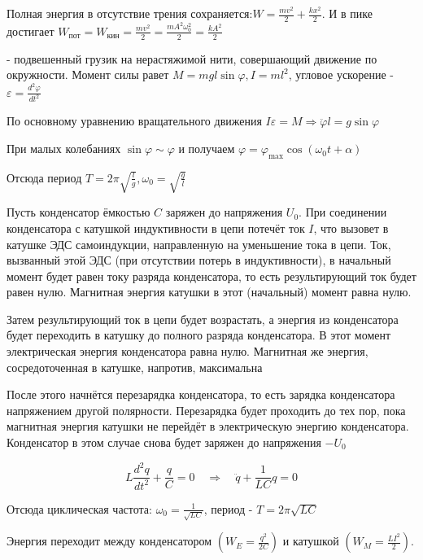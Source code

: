 \documentclass[12pt]{article}
\begin{document}
Полная энергия в отсутствие трения сохраняется:$W = \frac{mv^2}{2} + \frac{kx^2}{2}$.
И в пике достигает $W_{\text{пот}} = W_{\text{кин}} = \frac{mv^2}{2} = \frac{mA^2\omega_0^2}{2} = \frac{kA^2}{2}$
    
 - подвешенный грузик на нерастяжимой нити, совершающий движение по окружности.
Момент силы равет $M = m g l \sin \varphi, I = m l^2$, угловое ускорение - $\varepsilon = \frac{d^2 \varphi}{d t^2}$

По основному уравнению вращательного движения $I \varepsilon = M \Longrightarrow \ddot \varphi l = g \sin \varphi$

При малых колебаниях $\sin \varphi \sim \varphi$ и получаем $\varphi = \varphi_{\max} \cos (\omega_0 t + \alpha)$

Отсюда период $T = 2\pi\sqrt{\frac{l}{g}}, \omega_0 = \sqrt{\frac{g}{l}}$

Пусть конденсатор ёмкостью $C$ заряжен до напряжения $U_0$. 
При соединении конденсатора с катушкой индуктивности в цепи потечёт ток $I$, 
что вызовет в катушке ЭДС самоиндукции, направленную на уменьшение тока в цепи. 
Ток, вызванный этой ЭДС (при отсутствии потерь в индуктивности), 
в начальный момент будет равен току разряда конденсатора, то есть результирующий ток будет равен нулю. 
Магнитная энергия катушки в этот (начальный) момент равна нулю.

Затем результирующий ток в цепи будет возрастать, а энергия из конденсатора будет переходить 
в катушку до полного разряда конденсатора. В этот момент электрическая энергия конденсатора равна нулю. 
Магнитная же энергия, сосредоточенная в катушке, напротив, максимальна

После этого начнётся перезарядка конденсатора, то есть зарядка конденсатора напряжением другой полярности. 
Перезарядка будет проходить до тех пор, пока магнитная энергия катушки не перейдёт в электрическую энергию 
конденсатора. Конденсатор в этом случае снова будет заряжен до напряжения $-U_0$

\[
L\frac{d^2q}{dt^2} + \frac{q}{C} = 0 \quad \Longrightarrow \quad \ddot{q} + \frac{1}{LC}q = 0
\]

Отсюда циклическая частота: $\omega_0 = \frac{1}{\sqrt{LC}}$, период - $T = 2\pi\sqrt{LC}$

Энергия переходит между конденсатором $\left(W_E = \frac{q^2}{2C}\right)$ и катушкой $\left(W_M = \frac{LI^2}{2}\right)$.

\end{document}
